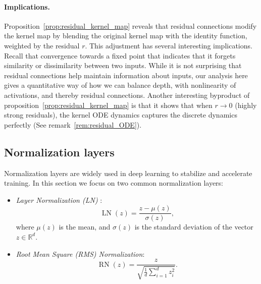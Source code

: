 \documentclass[twoside]{article}
\theoremstyle{definition}
\begin{document}
\paragraph{Implications.} Proposition~\ref{prop:residual_kernel_map} reveals that residual connections modify the kernel map by blending the original kernel map with the identity function, weighted by the residual $r$. This adjustment has several interesting implications.  Recall that convergence towards a fixed point that indicates that it forgets similarity or dissimilarity between two inputs. While it is not surprising that residual connections help maintain information about inputs, our analysis here gives a quantitative way of how we can balance depth, with nonlinearity of activations, and thereby residual connections.  Another interesting byproduct of proposition~\ref{prop:residual_kernel_map} is that it shows that when $r\to 0$ (highly strong residuals), the kernel ODE dynamics captures the discrete dynamics perfectly (See remark~\ref{rem:residual_ODE}).






\subsection{Normalization layers}

Normalization layers are widely used in deep learning to stabilize and accelerate training. In this section we focus on two common normalization layers:
\begin{itemize}
    \item \textit{Layer Normalization (LN)} \citep{ba2016layer}:
  \begin{equation}
  \operatorname{LN}(z) = \frac{z - \mu(z)}{\sigma(z)},
  \end{equation}
  where $\mu(z)$ is the mean, and $\sigma(z)$ is the standard deviation of the vector $z \in \mathbb{R}^d$.
  \item \textit{Root Mean Square (RMS) Normalization}:
  \begin{equation}
  \operatorname{RN}(z) = \frac{z}{ \sqrt{ \frac{1}{d} \sum_{i=1}^d z_i^2 } }.
  \end{equation}
\end{itemize}
\end{document}
